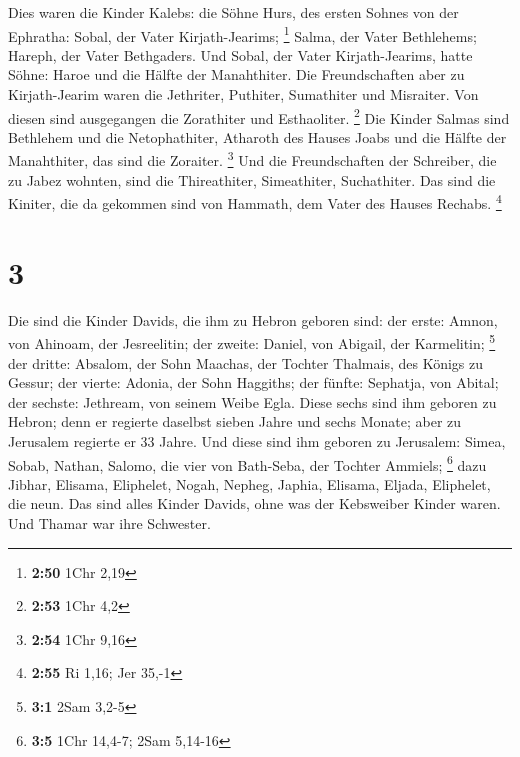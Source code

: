  Dies waren die Kinder Kalebs: die Söhne Hurs, des ersten
Sohnes von der Ephratha: Sobal, der Vater Kirjath-Jearims; \footnote{\textbf{2:50}
  1Chr 2,19}  Salma, der Vater Bethlehems; Hareph, der
Vater Bethgaders.  Und Sobal, der Vater Kirjath-Jearims,
hatte Söhne: Haroe und die Hälfte der Manahthiter.  Die
Freundschaften aber zu Kirjath-Jearim waren die Jethriter, Puthiter,
Sumathiter und Misraiter. Von diesen sind ausgegangen die Zorathiter und
Esthaoliter. \footnote{\textbf{2:53} 1Chr 4,2}  Die
Kinder Salmas sind Bethlehem und die Netophathiter, Atharoth des Hauses
Joabs und die Hälfte der Manahthiter, das sind die Zoraiter. \footnote{\textbf{2:54}
  1Chr 9,16}  Und die Freundschaften der Schreiber, die
zu Jabez wohnten, sind die Thireathiter, Simeathiter, Suchathiter. Das
sind die Kiniter, die da gekommen sind von Hammath, dem Vater des Hauses
Rechabs. \footnote{\textbf{2:55} Ri 1,16; Jer 35,-1}

\hypertarget{section-1}{%
\section{3}\label{section-1}}

 Die sind die Kinder Davids, die ihm zu Hebron geboren
sind: der erste: Amnon, von Ahinoam, der Jesreelitin; der zweite:
Daniel, von Abigail, der Karmelitin; \footnote{\textbf{3:1} 2Sam 3,2-5}
 der dritte: Absalom, der Sohn Maachas, der Tochter
Thalmais, des Königs zu Gessur; der vierte: Adonia, der Sohn Haggiths;
 der fünfte: Sephatja, von Abital; der sechste: Jethream,
von seinem Weibe Egla.  Diese sechs sind ihm geboren zu
Hebron; denn er regierte daselbst sieben Jahre und sechs Monate; aber zu
Jerusalem regierte er 33 Jahre.  Und diese sind ihm
geboren zu Jerusalem: Simea, Sobab, Nathan, Salomo, die vier von
Bath-Seba, der Tochter Ammiels; \footnote{\textbf{3:5} 1Chr 14,4-7; 2Sam
  5,14-16}  dazu Jibhar, Elisama, Eliphelet,
 Nogah, Nepheg, Japhia,  Elisama, Eljada,
Eliphelet, die neun.  Das sind alles Kinder Davids, ohne
was der Kebsweiber Kinder waren. Und Thamar war ihre Schwester.

